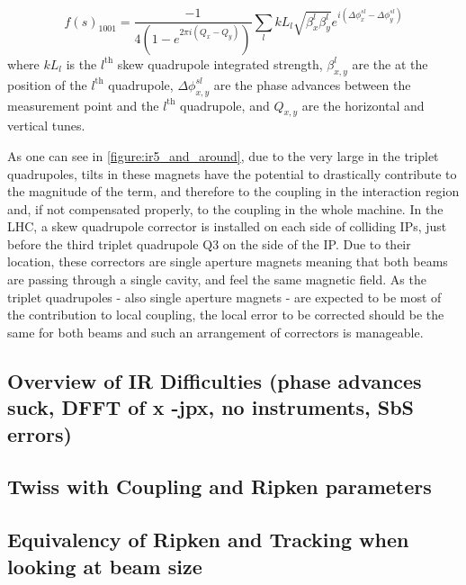 \begin{equation}
    f(s)_{1001} = \frac{-1}{4\left(1-e^{2 \pi i\left(Q_x-Q_y\right)}\right)} \sum_l k L_l \sqrt{\beta_x^l \beta_y^l} e^{i\left(\Delta \phi_x^{s l}-\Delta \phi_y^{s l}\right)}
    \label{eq:skew_quad_contribution_to_f1001}
\end{equation}
where \(k L_l\) is the \(l^{\mathrm{th}}\) skew quadrupole integrated strength, \(\beta^l_{x,y}\) are the \betafunctions at the position of the \(l^{\mathrm{th}}\) quadrupole, \(\Delta \phi^{sl}_{x,y}\) are the phase advances between the measurement point and the \(l^{\mathrm{th}}\) quadrupole, and \(Q_{x,y}\) are the horizontal and vertical tunes.

As one can see in \cref{figure:ir5_and_around}, due to the very large \betafunctions in the triplet quadrupoles, tilts in these magnets have the potential to drastically contribute to the magnitude of the \foneohone term, and therefore to the coupling in the interaction region and, if not compensated properly, to the coupling in the whole machine.
In the LHC, a skew quadrupole corrector is installed on each side of colliding IPs, just before the third triplet quadrupole \(\mathrm{Q3}\) on the side of the IP.
Due to their location, these correctors are single aperture magnets meaning that both beams are passing through a single cavity, and feel the same magnetic field.
As the triplet quadrupoles - also single aperture magnets - are expected to be most of the contribution to local coupling, the local error to be corrected should be the same for both beams and such an arrangement of correctors is manageable.

\subsection{Overview of IR Difficulties (phase advances suck, DFFT of x -jpx, no instruments, SbS errors)}

\subsection{Twiss with Coupling and Ripken parameters}

\subsection{Equivalency of Ripken and Tracking when looking at beam size}


